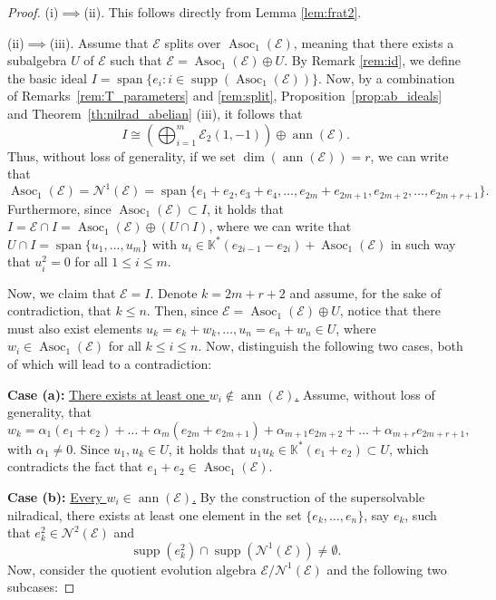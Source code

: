 \documentclass[12pt,reqno]{amsart}
\theoremstyle{definition}
\theoremstyle{remark}
\DeclareMathOperator{\ann}{ann}
\DeclareMathOperator{\spa}{span}
\DeclareMathOperator{\supp}{supp}
\DeclareMathOperator{\asoc}{Asoc}
\numberwithin{equation}{section}
\begin{document}
\begin{proof}
(i)$\implies$(ii). This follows directly from Lemma \ref{lem:frat2}.

(ii)$\implies$(iii). Assume that $\mathcal{E}$ splits over $\asoc_1(\mathcal{E})$, meaning that there exists a subalgebra $U$ of $\mathcal{E}$ such that $\mathcal{E}=\asoc_1(\mathcal{E})\oplus U$. By Remark \ref{rem:id}, we define the basic ideal $I=\spa\{e_i\colon i\in\supp(\asoc_1(\mathcal{E}))\}$. Now, by a combination of Remarks~\ref{rem:T_parameters} and \ref{rem:split}, Proposition~\ref{prop:ab_ideals} and Theorem~\ref{th:nilrad_abelian} (iii), it follows that 
$$I\cong\left(\bigoplus_{i=1}^m\mathcal{E}_2(1,-1)\right)\oplus\ann(\mathcal{E}).$$
Thus, without loss of generality, if we set $\dim{(\ann(\mathcal{E}))}=r$, we can write that
\[\asoc_1(\mathcal{E})=\mathcal{N}^1(\mathcal{E})=\spa\{e_1+e_2,e_3+e_4,\dots,e_{2m}+e_{2m+1},e_{2m+2},\dots,e_{2m+r+1}\}.\]
Furthermore, since $\asoc_1(\mathcal{E})\subset I$, it holds that $I=\mathcal{E}\cap I=\asoc_1(\mathcal{E})\oplus(U\cap I)$, where we can write that $U\cap I=\spa\{u_1,\dots,u_m\}$ with $u_i\in\mathbb{K}^*(e_{2i-1}-e_{2i})+\asoc_1(\mathcal{E})$ in such way that $u_i^2=0$ for all $1\leq i\leq m$.

Now, we claim that $\mathcal{E}=I$. Denote $k=2m+r+2$ and assume, for the sake of contradiction, that $k\leq n$. Then, since $\mathcal{E}=\asoc_1(\mathcal{E})\oplus U$, notice that there must also exist elements $u_k=e_k+w_k,\dots,u_n=e_n+w_n\in U$, where $w_i\in\asoc_1(\mathcal{E})$ for all $k\leq i\leq n$.
Now, distinguish the following two cases, both of which will lead to a contradiction:

{\bf Case (a):} \underline{There exists at least one $w_i\notin\ann(\mathcal{E})$.}
Assume, without loss of generality, that 
\[w_k=\alpha_{1}(e_1+e_2)+\dots+\alpha_{m}(e_{2m}+e_{2m+1})+\alpha_{m+1}e_{2m+2}+\dots+\alpha_{m+r}e_{2m+r+1},\]
with $\alpha_1\neq0$. Since $u_1,u_k\in U$, it holds that $u_1u_k\in\mathbb{K}^*(e_1+e_2)\subset U$, which contradicts the fact that $e_1+e_2\in\asoc_1(\mathcal{E})$.

{\bf Case (b):} \underline{Every $w_i\in\ann(\mathcal{E})$.} 
By the construction of the supersolvable nilradical, there exists at least one element in the set $\{e_k,\dots,e_n\}$, say $e_k$, such that $e_k^2\in\mathcal{N}^2(\mathcal{E})$ and
\[\supp(e_k^2)\cap\supp(\mathcal{N}^1(\mathcal{E}))\neq\emptyset.\]
Now, consider the quotient evolution algebra
$\mathcal{E}/\mathcal{N}^1(\mathcal{E})$ and the following two subcases:


\end{proof}
\end{document}
